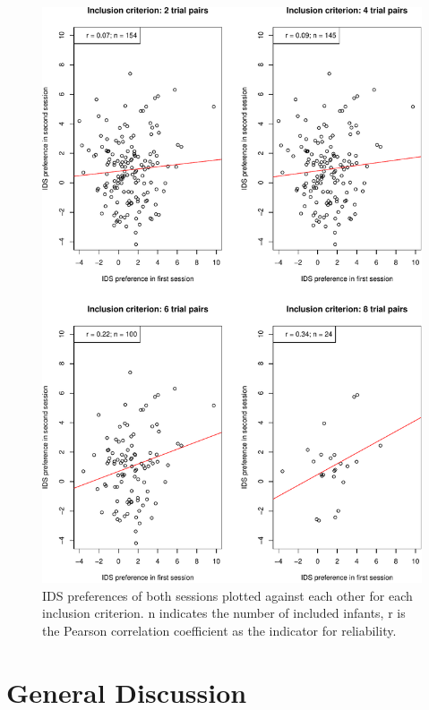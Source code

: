\documentclass[
  man,floatsintext]{apa6}
\begin{document}
\begin{figure}

{\centering \includegraphics[width=5in]{Retest_current_draft_files/figure-latex/unnamed-chunk-7-1} 

}

\caption{IDS preferences of both sessions plotted against each other for each inclusion criterion. n indicates the number of included infants, r is the Pearson correlation coefficient as the indicator for reliability.}\label{fig:unnamed-chunk-7}
\end{figure}

\hypertarget{general-discussion}{%
\section{General Discussion}\label{general-discussion}}
\end{document}
